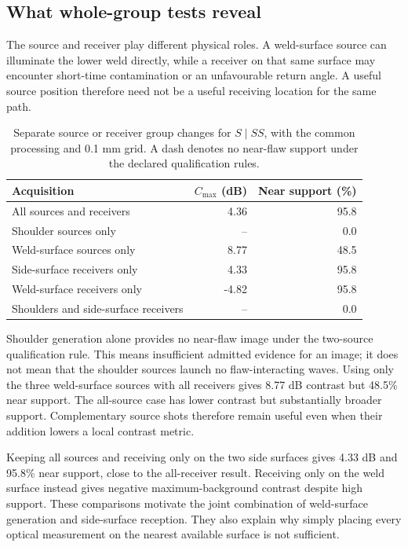 \documentclass[11pt]{article}
\begin{document}
\subsection{What whole-group tests reveal}
The source and receiver play different physical roles. A weld-surface source can illuminate the lower weld directly, while a receiver on that same surface may encounter short-time contamination or an unfavourable return angle. A useful source position therefore need not be a useful receiving location for the same path.

\begin{table}[!htbp]\centering\small
\caption{Separate source or receiver group changes for $S\mid SS$, with the common processing and 0.1 mm grid. A dash denotes no near-flaw support under the declared qualification rules.}
\begin{tabularx}{\linewidth}{@{}Xrr@{}}\toprule
Acquisition & $C_{\max}$ (dB) & Near support (\%)\\\midrule
All sources and receivers & 4.36 & 95.8 \\
Shoulder sources only & -- & 0.0 \\
Weld-surface sources only & 8.77 & 48.5 \\
Side-surface receivers only & 4.33 & 95.8 \\
Weld-surface receivers only & -4.82 & 95.8 \\
Shoulders and side-surface receivers & -- & 0.0 \\

\bottomrule\end{tabularx}
\label{saft:archive:partial:groups}
\end{table}

Shoulder generation alone provides no near-flaw image under the two-source qualification rule. This means insufficient admitted evidence for an image; it does not mean that the shoulder sources launch no flaw-interacting waves. Using only the three weld-surface sources with all receivers gives 8.77 dB contrast but 48.5\% near support. The all-source case has lower contrast but substantially broader support. Complementary source shots therefore remain useful even when their addition lowers a local contrast metric.

Keeping all sources and receiving only on the two side surfaces gives 4.33 dB and 95.8\% near support, close to the all-receiver result. Receiving only on the weld surface instead gives negative maximum-background contrast despite high support. These comparisons motivate the joint combination of weld-surface generation and side-surface reception. They also explain why simply placing every optical measurement on the nearest available surface is not sufficient.
\end{document}
